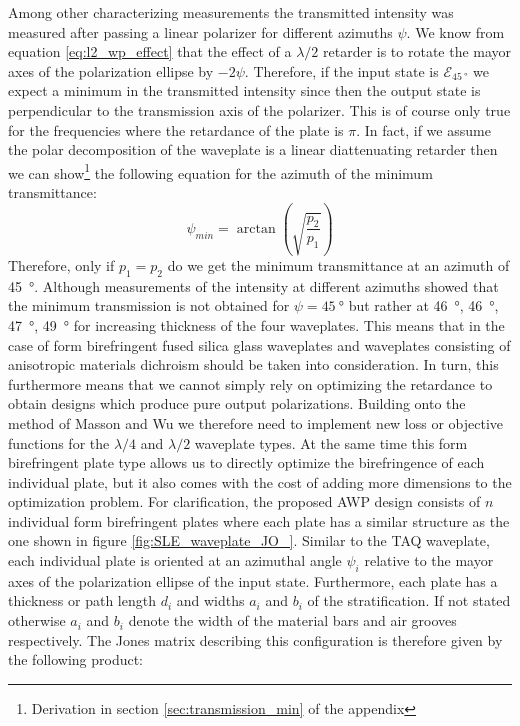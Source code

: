 Among other characterizing measurements the transmitted intensity was measured after passing a linear polarizer for different azimuths $\psi$. We know from equation \ref{eq:l2_wp_effect} that the effect of a $\lambda/2$ retarder is to rotate the mayor axes of the polarization ellipse by $-2\psi$. Therefore, if the input state is $\bm{\mathcal{E}}_{\SI{45}{\degree}}$ we expect a minimum in the transmitted intensity since then the output state is perpendicular to the transmission axis of the polarizer. This is of course only true for the frequencies where the retardance of the plate is $\pi$. In fact, if we assume the polar decomposition of the waveplate is a linear diattenuating retarder then we can show\footnote{Derivation in section \ref{sec:transmission_min} of the appendix} the following equation for the azimuth of the minimum transmittance:  
\begin{equation}
    \psi_{min}=\arctan\left(\sqrt{\frac{p_2}{p_1}}\right)
\end{equation}
Therefore, only if $p_1=p_2$ do we get the minimum transmittance at an azimuth of \SI{45}{\degree}. Although measurements of the intensity at different azimuths showed that the minimum transmission is not obtained for $\psi=\SI{45}{\degree}$ but rather at \SI{46}{\degree}, \SI{46}{\degree}, \SI{47}{\degree}, \SI{49}{\degree} for increasing thickness of the four waveplates. This means that in the case of form birefringent fused silica glass waveplates and waveplates consisting of anisotropic materials dichroism should be taken into consideration. In turn, this furthermore means that we cannot simply rely on optimizing the retardance to obtain designs which produce pure output polarizations. Building onto the method of Masson and Wu we therefore need to implement new loss or objective functions for the $\lambda/4$ and $\lambda/2$ waveplate types. At the same time this form birefringent plate type allows us to directly optimize the birefringence of each individual plate, but it also comes with the cost of adding more dimensions to the optimization problem. For clarification, the proposed AWP design consists of $n$ individual form birefringent plates where each plate has a similar structure as the one shown in figure \ref{fig:SLE_waveplate_JO_}. Similar to the TAQ waveplate, each individual plate is oriented at an azimuthal angle $\psi_i$ relative to the mayor axes of the polarization ellipse of the input state. Furthermore, each plate has a thickness or path length $d_i$ and widths $a_i$ and $b_i$ of the stratification. If not stated otherwise $a_i$ and $b_i$ denote the width of the material bars and air grooves respectively. The Jones matrix describing this configuration is therefore given by the following product:
